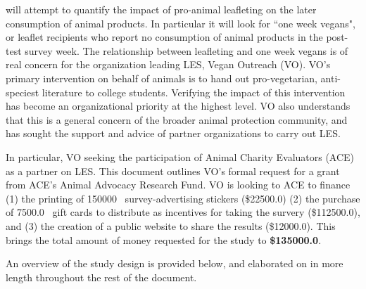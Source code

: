 \documentclass{tufte-handout}
\newcommand{\les}[0]{\textsc{LES}}%
\newcommand{\totalbooklets}[0]{\textsc{150000}}
\newcommand{\giftcardnum}[0]{\textsc{7500.0}}
\newcommand{\schoolnum}[0]{\textsc{75.0}}
\newcommand{\giftcardcost}[0]{\textsc{112500.0}}
\newcommand{\stickercost}[0]{\textsc{22500.0}}
\newcommand{\websitecost}[0]{\textsc{12000.0}}
\newcommand{\totalrequest}[0]{\textsc{135000.0}}
\begin{document}
\newthought{The Leafleting Effectiveness Survery (\les)} will attempt
to quantify the impact of pro-animal leafleting on the later 
consumption of animal products. In particular it will look for 
``one week vegans", or leaflet recipients who report no consumption of animal 
products in the post-test survey week. 
The relationship between leafleting and one week vegans is of real
concern for the organization leading \les, Vegan Outreach (VO). VO's
primary intervention on behalf of animals is to hand out pro-vegetarian,
anti-speciest literature to college students. Verifying the impact of this
intervention has become an organizational priority at the highest level.
VO also understands that this is a general concern of the broader
animal protection community, and has sought the support and advice of
partner organizations to carry out \les.

In particular, VO seeking the participation of Animal Charity 
Evaluators (ACE) as a partner on \les. This document outlines VO's formal
request for a grant from ACE's Animal Advocacy Research Fund. VO is 
looking to ACE to finance (1) the printing of \totalbooklets~ 
survey-advertising stickers (\$\stickercost) (2) the purchase of
\giftcardnum~ gift cards to distribute as incentives for taking the 
survery (\$\giftcardcost), and (3) the creation of a public website
to share the results (\$\websitecost). This brings the total amount
of money requested for the study to \textbf{\$\totalrequest}.

An overview of the study design is provided below, and elaborated 
on in more length throughout the rest of the document.

\end{document}
